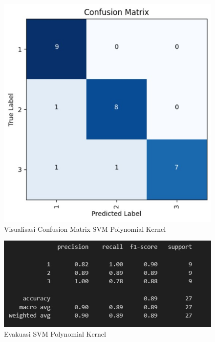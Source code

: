 \begin{figure} [H] \centering
  \includegraphics[scale=0.65]{gambar/cfppoly.jpg}
  \caption{Visualisasi Confusion Matrix SVM Polynomial Kernel}
  \label{fig:evalcfppolykernel}
\end{figure}

\begin{figure} [H] \centering
  \includegraphics[scale=0.65]{gambar/evalpoly.jpg}
  \caption{Evakuasi SVM Polynomial Kernel}
  \label{fig:evalpolykernel}
\end{figure}

